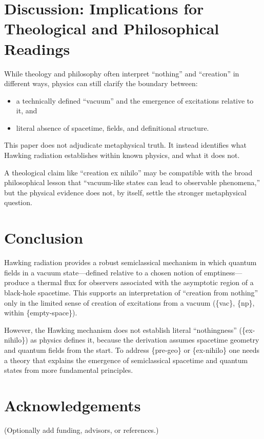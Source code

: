 \documentclass[11pt,a4paper]{article}
\begin{document}
\section{Discussion: Implications for Theological and Philosophical Readings}
While theology and philosophy often interpret ``nothing'' and ``creation'' in different ways, physics can still clarify the boundary between:
\begin{itemize}[leftmargin=2em]
\item a technically defined ``vacuum'' and the emergence of excitations relative to it, and
\item literal absence of spacetime, fields, and definitional structure.
\end{itemize}

This paper does not adjudicate metaphysical truth. It instead identifies what Hawking radiation establishes within known physics, and what it does not.

A theological claim like ``creation ex nihilo'' may be compatible with the broad philosophical lesson that ``vacuum-like states can lead to observable phenomena,'' but the physical evidence does not, by itself, settle the stronger metaphysical question.

\section{Conclusion}
Hawking radiation provides a robust semiclassical mechanism in which quantum fields in a vacuum state—defined relative to a chosen notion of emptiness—produce a thermal flux for observers associated with the asymptotic region of a black-hole spacetime. This supports an interpretation of ``creation from nothing'' only in the limited sense of creation of excitations from a vacuum (\{vac\}, \{np\}, within \{empty-space\}).

However, the Hawking mechanism does not establish literal ``nothingness'' (\{ex-nihilo\}) as physics defines it, because the derivation assumes spacetime geometry and quantum fields from the start. To address \{pre-geo\} or \{ex-nihilo\} one needs a theory that explains the emergence of semiclassical spacetime and quantum states from more fundamental principles.

\section*{Acknowledgements}
(Optionally add funding, advisors, or references.)
\end{document}
